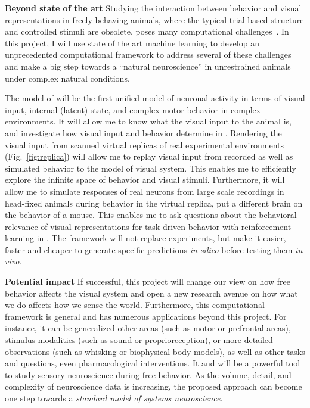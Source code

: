\documentclass[B2,COG]{ercgrant}
\begin{document}
\textbf{Beyond state of the art} 
Studying the interaction between behavior and visual representations in freely behaving animals, where the typical trial-based structure and controlled stimuli are obsolete, poses many computational challenges~\parencite{Busse2017-rt}.
In this project, I will use state of the art machine learning to develop an unprecedented computational framework to address several of these challenges and make a big step towards a ``natural neuroscience'' in unrestrained animals under complex natural conditions.

The model of  will be the first unified model of neuronal activity in terms of visual input, internal (latent) state, and complex motor behavior in complex environments. 
It will allow me to know what the visual input to the animal is, and investigate how visual input and behavior determine in . 
Rendering the visual input from scanned virtual replicas of real experimental environments (Fig.~\ref{fig:replica}) will allow me to replay visual input from recorded as well as simulated behavior to the model of visual system.
This enables me to efficiently explore the infinite space of behavior and visual stimuli.
Furthermore, it will allow me to simulate responses of real neurons from large scale recordings in head-fixed animals during behavior in the virtual replica, put a different brain on the behavior of a mouse. 
This enables me to ask questions about the behavioral relevance of visual representations for task-driven behavior with reinforcement learning in .
The framework will not replace experiments, but make it easier, faster and cheaper to generate specific predictions \textit{in silico} before testing them \textit{in vivo}.

\textbf{Potential impact} 
If successful, this project will change our view on how free behavior affects the visual system and open a new research avenue on how what we do affects how we sense the world. 
Furthermore, this computational framework is general and has numerous applications beyond this project. 
For instance, it can be generalized other areas (such as motor or prefrontal areas), stimulus modalities (such as sound or proprioreception), or more detailed observations (such as whisking or biophysical body models), as well as other tasks and questions, even pharmacological interventions.
It and will be a powerful tool to study sensory neuroscience during free behavior.
As the volume, detail, and complexity of neuroscience data is increasing, the proposed approach can become one step towards a \textit{standard model of systems neuroscience}.
\end{document}

